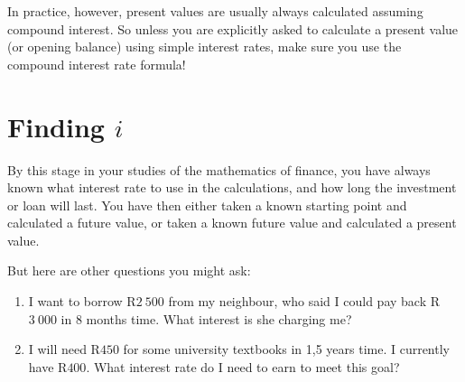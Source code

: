 In practice, however, present values are usually always calculated assuming compound interest. So unless you are explicitly asked to calculate a present value (or opening balance) using simple interest rates, make sure you use the compound interest rate formula!


\section{Finding $i$}
\label{sec:m:f11:interest}
By this stage in your studies of the mathematics of finance, you have always known what interest rate to use in the calculations, and how long the investment or loan will last. You have then either taken a known starting point and calculated a future value, or taken a known future value and calculated a present value.

But here are other questions you might ask:
\begin{enumerate}
\item{I want to borrow R$2~500$ from my neighbour, who said I could pay back R$3~000$ in 8 months time. What interest is she charging me?}
\item{I will need R$450$ for some university textbooks in 1,5 years time. I currently have R$400$. What interest rate do I need to earn to meet this goal?}
\end{enumerate}

